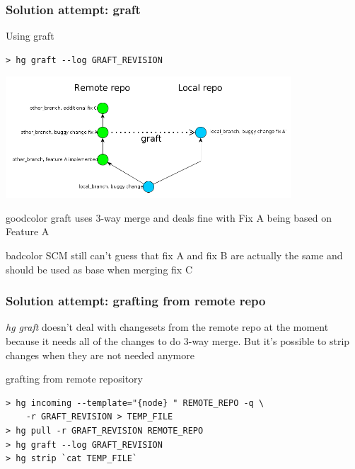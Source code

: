 \documentclass{beamer}
\begin{document}
\begin{frame}[fragile]
\frametitle{Solution attempt: graft}
\begin{exampleblock}{Using graft}
\begin{verbatim}
> hg graft --log GRAFT_REVISION
\end{verbatim}
\end{exampleblock}
\begin{center}
\includegraphics[width=0.8\textwidth]{img/using_graft}
\end{center}

\begin{beamercolorbox}[rounded=true,center,shadow=true]{goodcolor}
  graft uses 3-way merge and deals fine with Fix A being based on Feature A
\end{beamercolorbox}
\begin{beamercolorbox}[rounded=true,center,shadow=true]{badcolor}
  SCM still can't guess that fix A and fix B are actually the same and should be used as base when merging fix C
\end{beamercolorbox}
\end{frame}

\begin{frame}[fragile]
\frametitle{Solution attempt: grafting from remote repo}
\textit{hg graft} doesn't deal with changesets from the remote repo at the moment because it needs all of the changes to do 3-way merge. But it's possible to strip changes when they are not needed anymore
\begin{exampleblock}{grafting from remote repository}
\begin{verbatim}
> hg incoming --template="{node} " REMOTE_REPO -q \ 
    -r GRAFT_REVISION > TEMP_FILE
> hg pull -r GRAFT_REVISION REMOTE_REPO
> hg graft --log GRAFT_REVISION
> hg strip `cat TEMP_FILE`
\end{verbatim}
\end{exampleblock}
\end{frame}
\end{document}
